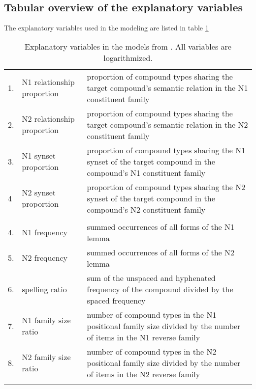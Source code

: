 

\subsection{Tabular overview of the explanatory variables}
\label{sec:overviewExplanatoryVariables}

The explanatory variables used in the modeling are listed in table \ref{tab:bs2016explanatory.variables}
\begin{table}[!htb]
  \small
  \begin{tabularx}{\textwidth}{l>{\raggedright\arraybackslash}p{3cm}>{\raggedright\arraybackslash}p{8cm}}
\lsptoprule
\multicolumn{3}{l}{{semantic explanatory variables}}\\\midrule
1.&N1 relationship proportion&proportion of compound types sharing the
target compound's semantic relation in the N1 constituent family\\                    
2.&N2 relationship proportion&proportion of compound types sharing the
target compound's semantic relation in the N2 constituent family\\
3.&N1 synset proportion&proportion of compound types sharing the
N1 synset of the target compound in the compound's N1 constituent family \\                
4&N2 synset proportion&proportion of compound types sharing the
N2 synset of the target compound in the compound's N2 constituent family      \\\tablevspace               
\multicolumn{3}{l}{{non-semantic explanatory variables}}\\\midrule
4.&N1 frequency &summed occurrences of all forms of the N1 lemma\\
5.&N2 frequency &summed occurrences of all forms of the N2 lemma\\
6.&spelling ratio&sum of the unspaced and hyphenated frequency of the
compound divided by the spaced frequency\\
7.&N1 family size ratio &number of compound types in the N1 positional
family size divided by the number of items in the N1 reverse family\\
8.&N2 family size ratio&number of compound types in the N2 positional
family size divided by the number of items in the N2 reverse family\\\lspbottomrule
  \end{tabularx}
  \caption{Explanatory variables in the models from
    \citet{BellandSchaefer:2016}. All variables are logarithmized.}
\label{tab:bs2016explanatory.variables}
\end{table}



